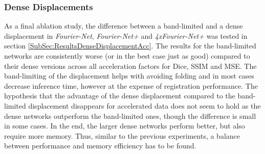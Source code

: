 \subsubsection{Dense Displacements} \label{SubSubSec:DiscussionDenseDisplacements}
As a final ablation study, the difference between a band-limited and a dense displacement in \emph{Fourier-Net}, \emph{Fourier-Net+} and \emph{4xFourier-Net+} was tested in section \ref{SubSec:ResultsDenseDisplacementAcc}. The results for the band-limited networks are consistently worse (or in the best case just as good) compared to their dense versions across all acceleration factors for Dice, SSIM and MSE. The band-limiting of the displacement helps with avoiding folding and in most cases decrease inference time, however at the expense of registration performance. The hypothesis that the advantage of the dense displacement compared to the band-limited displacement disappears for accelerated data does not seem to hold as the dense networks outperform the band-limited ones, though the difference is small in some cases. In the end, the larger dense networks perform better, but also require more memory. Thus, similar to the previous experiments, a balance between performance and memory efficiency has to be found.

